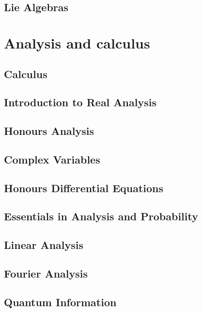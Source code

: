 \documentclass[12pt]{report}
\theoremstyle{definition}
\begin{document}
\chapter{Lie Algebras}\label{cha:lie-algebras} \part{Analysis and calculus} \chapter{Calculus}\label{cha:calculus}
\chapter{Introduction to Real Analysis}\label{cha:intr-real-analys}

\chapter{Honours Analysis}\label{cha:honours-analysis}

\chapter{Complex Variables}\label{cha:complex-variables}

\chapter{Honours Differential Equations}\label{cha:hono-diff-equat}

\chapter{Essentials in Analysis and Probability\label{cha:essent-analys-prob}}

\chapter{Linear Analysis}\label{cha:linear-analysis}

\chapter{Fourier Analysis}\label{cha:fourier-analysis}

\chapter{Quantum Information}\label{cha:quantum-information}
\end{document}
